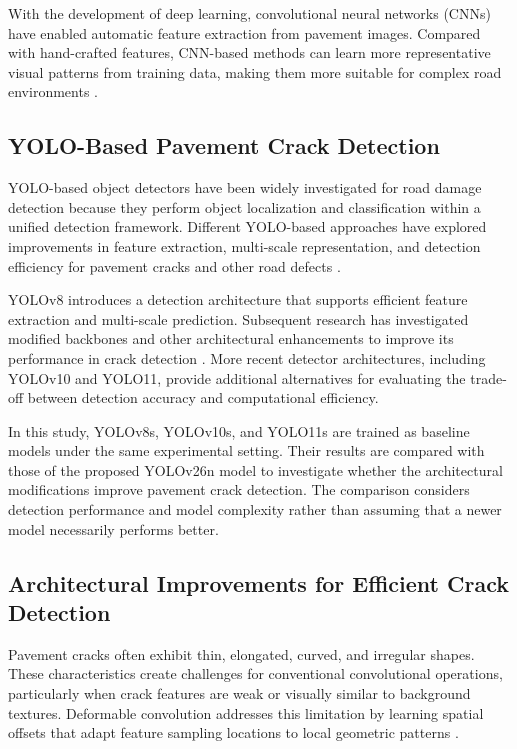 \documentclass[conference]{IEEEtran}
\begin{document}
With the development of deep learning, convolutional neural networks
(CNNs) have enabled automatic feature extraction from pavement images.
Compared with hand-crafted features, CNN-based methods can learn
more representative visual patterns from training data, making them
more suitable for complex road environments
\cite{P11_RDD2020,P13_RoadDamageSurvey,P14_PavementCrackDL}.

\subsection{YOLO-Based Pavement Crack Detection}

YOLO-based object detectors have been widely investigated for road
damage detection because they perform object localization and
classification within a unified detection framework. Different
YOLO-based approaches have explored improvements in feature extraction,
multi-scale representation, and detection efficiency for pavement
cracks and other road defects
\cite{P10_AutomatedPavementCracks,P15_YOLOv5_RoadDamage,
P16_RDD_YOLO,P19_TransXNet_YOLOv8}.

YOLOv8 introduces a detection architecture that supports efficient
feature extraction and multi-scale prediction. Subsequent research
has investigated modified backbones and other architectural
enhancements to improve its performance in crack detection
\cite{P9_ImprovedYOLOv8Concrete,P19_TransXNet_YOLOv8,
P24_YOLOv8_PD,P26_YOLO_DGVG}. More recent detector architectures,
including YOLOv10 and YOLO11, provide additional alternatives for
evaluating the trade-off between detection accuracy and computational
efficiency.

In this study, YOLOv8s, YOLOv10s, and YOLO11s are trained as baseline
models under the same experimental setting. Their results are
compared with those of the proposed YOLOv26n model to investigate
whether the architectural modifications improve pavement crack
detection. The comparison considers detection performance and model
complexity rather than assuming that a newer model necessarily
performs better.

\subsection{Architectural Improvements for Efficient Crack Detection}

Pavement cracks often exhibit thin, elongated, curved, and irregular
shapes. These characteristics create challenges for conventional
convolutional operations, particularly when crack features are weak
or visually similar to background textures. Deformable convolution
addresses this limitation by learning spatial offsets that adapt
feature sampling locations to local geometric patterns
\cite{P20_DeformableConv,P34_InternImage}.
\end{document}
